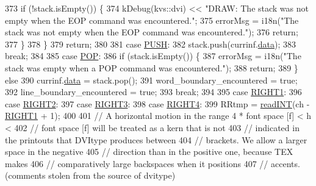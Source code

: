 \begin{DoxyCode}
{373             \textcolor{keywordflow}{if} (!stack.isEmpty()) \{
374               kDebug(kvs::dvi) << \textcolor{stringliteral}{"DRAW: The stack was not empty when the EOP command was encountered."};
375               errorMsg = i18n(\textcolor{stringliteral}{"The stack was not empty when the EOP command was encountered."});
376               \textcolor{keywordflow}{return};
377             \}
378           \}
379           \textcolor{keywordflow}{return};
380 
381         \textcolor{keywordflow}{case} \hyperlink{dvi_8h_a431b92b32ec924789b2be268651a3fdd}{PUSH}:
382           stack.push(currinf.\hyperlink{structdrawinf_af73f66288002f0a25c7843a534bf1340}{data});
383           \textcolor{keywordflow}{break};
384 
385         \textcolor{keywordflow}{case} \hyperlink{dvi_8h_a0b06d6d6f5a540a62659a417de0ad69d}{POP}:
386           \textcolor{keywordflow}{if} (stack.isEmpty()) \{
387             errorMsg = i18n(\textcolor{stringliteral}{"The stack was empty when a POP command was encountered."});
388             \textcolor{keywordflow}{return};
389           \} \textcolor{keywordflow}{else}
390             currinf.\hyperlink{structdrawinf_af73f66288002f0a25c7843a534bf1340}{data} = stack.pop();
391           word\_boundary\_encountered = \textcolor{keyword}{true};
392           line\_boundary\_encountered = \textcolor{keyword}{true};
393           \textcolor{keywordflow}{break};
394 
395         \textcolor{keywordflow}{case} \hyperlink{dvi_8h_a7a6ad184c608528336f95e318c2a2ff7}{RIGHT1}:
396         \textcolor{keywordflow}{case} \hyperlink{dvi_8h_a56979190753366cf262c9f2d00880241}{RIGHT2}:
397         \textcolor{keywordflow}{case} \hyperlink{dvi_8h_aa5f1f20567ff62615b490697b3f1a2d4}{RIGHT3}:
398         \textcolor{keywordflow}{case} \hyperlink{dvi_8h_a2781807160ddae83e3a01fb7cfbb880d}{RIGHT4}:
399           RRtmp = \hyperlink{classbigEndianByteReader_ad85cb1f2cce7f4de7abc632b5e95223b}{readINT}(ch - \hyperlink{dvi_8h_a7a6ad184c608528336f95e318c2a2ff7}{RIGHT1} + 1);
400 
401           \textcolor{comment}{// A horizontal motion in the range 4 * font space [f] < h <}
402           \textcolor{comment}{// font space [f] will be treated as a kern that is not}
403           \textcolor{comment}{// indicated in the printouts that DVItype produces between}
404           \textcolor{comment}{// brackets. We allow a larger space in the negative}
405           \textcolor{comment}{// direction than in the positive one, because TEX makes}
406           \textcolor{comment}{// comparatively large backspaces when it positions}
407           \textcolor{comment}{// accents. (comments stolen from the source of dvitype)}
}
\end{DoxyCode}
